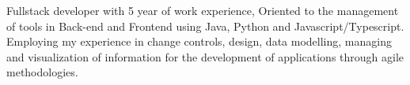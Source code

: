 

\begin{cvparagraph}

Fullstack developer with 5 year of work experience, Oriented to the management of tools in Back-end and Frontend using Java, Python and Javascript/Typescript. Employing my experience in change controls, design, data modelling, managing and visualization of information for the development of applications through agile methodologies.
\end{cvparagraph}
